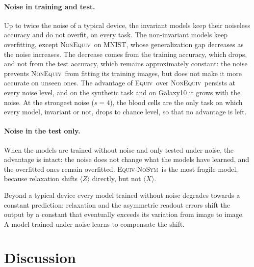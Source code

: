 \documentclass[aps,pra,reprint,superscriptaddress,longbibliography]{revtex4-2}
\newcommand{\Equiv}{\textsc{Equiv}}
\newcommand{\NonEquiv}{\textsc{NonEquiv}}
\newcommand{\NoSym}{\textsc{Equiv-NoSym}}
\begin{document}
\paragraph{Noise in training and test.} Up to twice the noise of a typical device, the invariant models keep their noiseless accuracy and do not overfit, on every task. The non-invariant models keep overfitting, except \NonEquiv\ on MNIST, whose generalization gap decreases as the noise increases. The decrease comes from the training accuracy, which drops, and not from the test accuracy, which remains approximately constant: the noise prevents \NonEquiv\ from fitting its training images, but does not make it more accurate on unseen ones. The advantage of \Equiv\ over \NonEquiv\ persists at every noise level, and on the synthetic task and on Galaxy10 it grows with the noise. At the strongest noise ($s=4$), the blood cells are the only task on which every model, invariant or not, drops to chance level, so that no advantage is left.

\paragraph{Noise in the test only.} When the models are trained without noise and only tested under noise, the advantage is intact: the noise does not change what the models have learned, and the overfitted ones remain overfitted. \NoSym\ is the most fragile model, because relaxation shifts $\langle Z\rangle$ directly, but not $\langle X\rangle$.

Beyond a typical device every model trained without noise degrades towards a constant prediction: relaxation and the asymmetric readout errors shift the output by a constant that eventually exceeds its variation from image to image. A model trained under noise learns to compensate the shift.

\section{Discussion}\label{sec:discussion}
\end{document}
